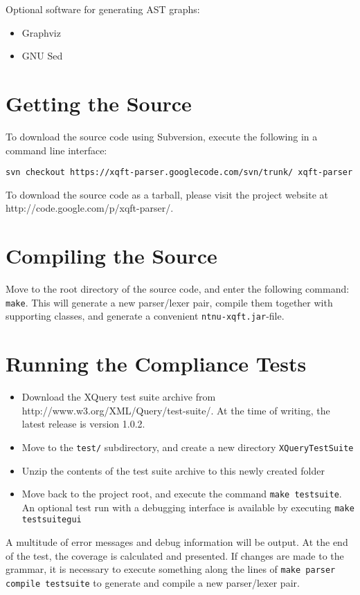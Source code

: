 Optional software for generating AST graphs:
\begin{itemize}
  \item Graphviz
  \item GNU Sed
\end{itemize}

\section*{Getting the Source}
To download the source code using Subversion, execute the following in a
command line interface:

\verb!svn checkout https://xqft-parser.googlecode.com/svn/trunk/ xqft-parser!

To download the source code as a tarball, please visit the project website at
http://code.google.com/p/xqft-parser/.

\section*{Compiling the Source}
Move to the root directory of the source code, and enter the following command:
\verb!make!. This will generate a new parser/lexer pair, compile them together
with supporting classes, and generate a convenient \verb!ntnu-xqft.jar!-file.

\section*{Running the Compliance Tests}
\begin{itemize}
\item Download the XQuery test suite archive from
http://www.w3.org/XML/Query/test-suite/. At the time of writing, the latest
release is version 1.0.2. 
\item Move to the \verb!test/! subdirectory, and create a new directory
\verb!XQueryTestSuite!
\item Unzip the contents of the test suite archive to this newly created folder
\item Move back to the project root, and execute the command 
\verb!make testsuite!. An optional test run with a debugging interface is
available by executing \verb!make testsuitegui!
\end{itemize}

A multitude of error messages and debug information will be output. At the end
of the test, the coverage is calculated and presented. If changes are made to
the grammar, it is necessary to execute something along the lines of 
\verb!make parser compile testsuite! to generate and compile a new parser/lexer
pair.